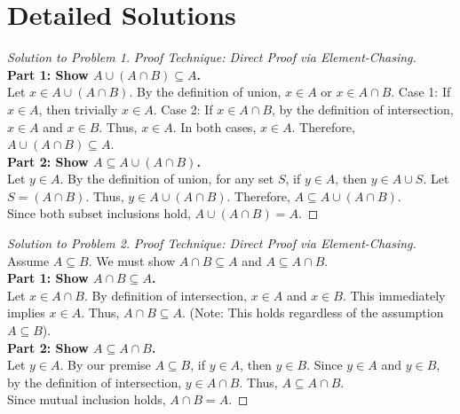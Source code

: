 \documentclass[12pt]{article}
\theoremstyle{definition}
\begin{document}
\section{Detailed Solutions}
\label{sec:solutions}

\begin{proof}[Solution to Problem 1]
\textit{Proof Technique: Direct Proof via Element-Chasing.} \\
\textbf{Part 1: Show $A \cup (A \cap B) \subseteq A$.} \\
Let $x \in A \cup (A \cap B)$. By the definition of union, $x \in A$ or $x \in A \cap B$. 
Case 1: If $x \in A$, then trivially $x \in A$. 
Case 2: If $x \in A \cap B$, by the definition of intersection, $x \in A$ and $x \in B$. Thus, $x \in A$. 
In both cases, $x \in A$. Therefore, $A \cup (A \cap B) \subseteq A$. \\
\textbf{Part 2: Show $A \subseteq A \cup (A \cap B)$.} \\
Let $y \in A$. By the definition of union, for any set $S$, if $y \in A$, then $y \in A \cup S$. Let $S = (A \cap B)$. Thus, $y \in A \cup (A \cap B)$. Therefore, $A \subseteq A \cup (A \cap B)$. \\
Since both subset inclusions hold, $A \cup (A \cap B) = A$.
\end{proof}

\begin{proof}[Solution to Problem 2]
\textit{Proof Technique: Direct Proof via Element-Chasing.} \\
Assume $A \subseteq B$. We must show $A \cap B \subseteq A$ and $A \subseteq A \cap B$. \\
\textbf{Part 1: Show $A \cap B \subseteq A$.} \\
Let $x \in A \cap B$. By definition of intersection, $x \in A$ and $x \in B$. This immediately implies $x \in A$. Thus, $A \cap B \subseteq A$. (Note: This holds regardless of the assumption $A \subseteq B$). \\
\textbf{Part 2: Show $A \subseteq A \cap B$.} \\
Let $y \in A$. By our premise $A \subseteq B$, if $y \in A$, then $y \in B$. Since $y \in A$ and $y \in B$, by the definition of intersection, $y \in A \cap B$. Thus, $A \subseteq A \cap B$. \\
Since mutual inclusion holds, $A \cap B = A$.
\end{proof}
\end{document}
